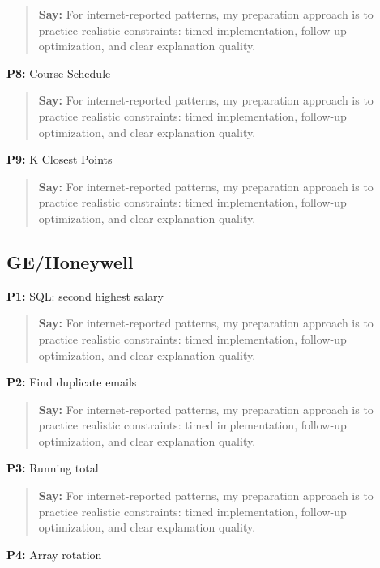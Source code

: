 \documentclass[9pt,a4paper]{article}
\begin{document}
\begin{quote}\small\textbf{Say:} For internet-reported patterns, my preparation approach is to practice realistic constraints: timed implementation, follow-up optimization, and clear explanation quality.\end{quote}
\vspace{2mm}
\textbf{P8:} Course Schedule

\begin{quote}\small\textbf{Say:} For internet-reported patterns, my preparation approach is to practice realistic constraints: timed implementation, follow-up optimization, and clear explanation quality.\end{quote}
\vspace{2mm}
\textbf{P9:} K Closest Points

\begin{quote}\small\textbf{Say:} For internet-reported patterns, my preparation approach is to practice realistic constraints: timed implementation, follow-up optimization, and clear explanation quality.\end{quote}
\vspace{2mm}
\subsection{GE/Honeywell}
\textbf{P1:} SQL: second highest salary

\begin{quote}\small\textbf{Say:} For internet-reported patterns, my preparation approach is to practice realistic constraints: timed implementation, follow-up optimization, and clear explanation quality.\end{quote}
\vspace{2mm}
\textbf{P2:} Find duplicate emails

\begin{quote}\small\textbf{Say:} For internet-reported patterns, my preparation approach is to practice realistic constraints: timed implementation, follow-up optimization, and clear explanation quality.\end{quote}
\vspace{2mm}
\textbf{P3:} Running total

\begin{quote}\small\textbf{Say:} For internet-reported patterns, my preparation approach is to practice realistic constraints: timed implementation, follow-up optimization, and clear explanation quality.\end{quote}
\vspace{2mm}
\textbf{P4:} Array rotation
\end{document}
